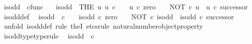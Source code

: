\begin{isabellebody}
\endisatagproof
{\isafoldproof}%
%
\isadelimproof
%
\endisadelimproof
%
\isadelimdocument
%
\endisadelimdocument
%
\isatagdocument
%
\isamarkuptrue%
%
\endisatagdocument
{\isafolddocument}%
%
\isadelimdocument
%
\endisadelimdocument
{}\isamarkupfalse%
\ is{\isacharunderscore}{\kern0pt}odd\ {\isacharcolon}{\kern0pt}{\isacharcolon}{\kern0pt}\ {\isachardoublequoteopen}cfunc{\isachardoublequoteclose}\ \isanewline
\ \ {\isachardoublequoteopen}is{\isacharunderscore}{\kern0pt}odd\ {\isacharequal}{\kern0pt}\ {\isacharparenleft}{\kern0pt}THE\ u{\isachardot}{\kern0pt}\ u{\isacharcolon}{\kern0pt}\ {\isasymnat}\isactrlsub c\ {\isasymrightarrow}\ {\isasymOmega}\ {\isasymand}\ u\ {\isasymcirc}\isactrlsub c\ zero\ {\isacharequal}{\kern0pt}\ {\isasymf}\ {\isasymand}\ NOT\ {\isasymcirc}\isactrlsub c\ u\ {\isacharequal}{\kern0pt}\ u\ {\isasymcirc}\isactrlsub c\ successor{\isacharparenright}{\kern0pt}{\isachardoublequoteclose}\isanewline
\isanewline
{}\isamarkupfalse%
\ is{\isacharunderscore}{\kern0pt}odd{\isacharunderscore}{\kern0pt}def{}{\isacharcolon}{\kern0pt}\isanewline
\ \ {\isachardoublequoteopen}is{\isacharunderscore}{\kern0pt}odd\ {\isacharcolon}{\kern0pt}\ {\isasymnat}\isactrlsub c\ {\isasymrightarrow}\ {\isasymOmega}\ {\isasymand}\ is{\isacharunderscore}{\kern0pt}odd\ {\isasymcirc}\isactrlsub c\ zero\ {\isacharequal}{\kern0pt}\ {\isasymf}\ {\isasymand}\ NOT\ {\isasymcirc}\isactrlsub c\ is{\isacharunderscore}{\kern0pt}odd\ {\isacharequal}{\kern0pt}\ is{\isacharunderscore}{\kern0pt}odd\ {\isasymcirc}\isactrlsub c\ successor{\isachardoublequoteclose}\isanewline
%
\isadelimproof
\ \ %
\endisadelimproof
%
\isatagproof
{}\isamarkupfalse%
\ {\isacharparenleft}{\kern0pt}unfold\ is{\isacharunderscore}{\kern0pt}odd{\isacharunderscore}{\kern0pt}def{\isacharcomma}{\kern0pt}\ rule\ theI{\isacharprime}{\kern0pt}{\isacharcomma}{\kern0pt}\ etcs{\isacharunderscore}{\kern0pt}rule\ natural{\isacharunderscore}{\kern0pt}number{\isacharunderscore}{\kern0pt}object{\isacharunderscore}{\kern0pt}property{}{\isacharparenright}{\kern0pt}%
\endisatagproof
{\isafoldproof}%
%
\isadelimproof
\isanewline
%
\endisadelimproof
\isanewline
{}\isamarkupfalse%
\ is{\isacharunderscore}{\kern0pt}odd{\isacharunderscore}{\kern0pt}type{\isacharbrackleft}{\kern0pt}type{\isacharunderscore}{\kern0pt}rule{\isacharbrackright}{\kern0pt}{\isacharcolon}{\kern0pt}\isanewline
\ \ {\isachardoublequoteopen}is{\isacharunderscore}{\kern0pt}odd\ {\isacharcolon}{\kern0pt}\ {\isasymnat}\isactrlsub c\ {\isasymrightarrow}\ {\isasymOmega}{\isachardoublequoteclose}\isanewline

\end{isabellebody}
